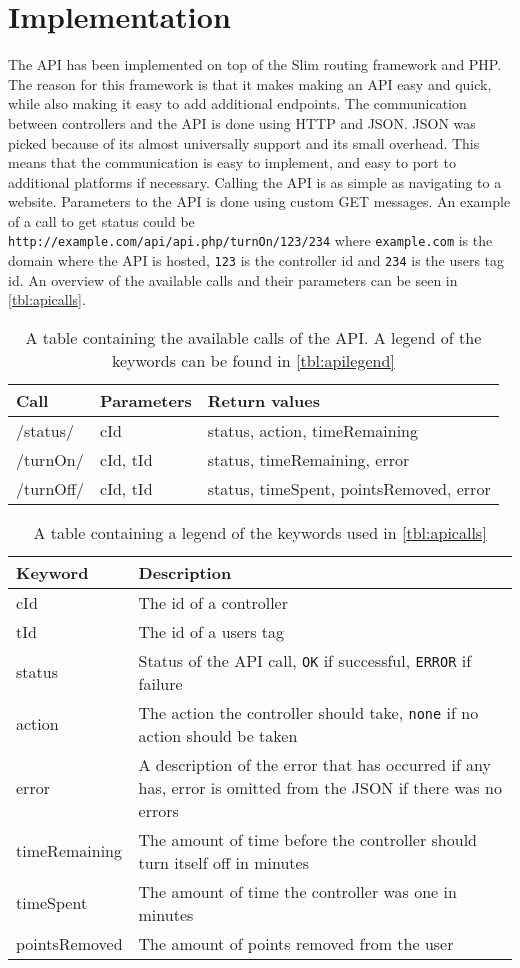 \section{Implementation}
The API has been implemented on top of the Slim routing framework and PHP. The reason for this framework is that it makes making an API easy and quick, while also making it easy to add additional endpoints. The communication between controllers and the API is done using HTTP and JSON. JSON was picked because of its almost universally support and its small overhead. This means that the communication is easy to implement, and easy to port to additional platforms if necessary. Calling the API is as simple as navigating to a website. Parameters to the API is done using custom GET messages. An example of a call to get status could be \texttt{http://example.com/api/api.php/turnOn/123/234} where \texttt{example.com} is the domain where the API is hosted, \texttt{123} is the controller id and \texttt{234} is the users tag id. An overview of the available calls and their parameters can be seen in \autoref{tbl:apicalls}.

\begin{table}[!h]
\begin{tabular}{| l | l | l |}
\hline
Call & Parameters & Return values \\
\hline
/status/ & cId & status, action, timeRemaining \\
\hline
/turnOn/ & cId, tId & status, timeRemaining, error \\
\hline
/turnOff/ & cId, tId & status, timeSpent, pointsRemoved, error \\
\hline
\end{tabular}
\caption{A table containing the available calls of the API. A legend of the keywords can be found in \autoref{tbl:apilegend}}
\label{tbl:apicalls}
\end{table}

\begin{table}[!h]
\begin{tabular}{| l | p{9cm} |}
\hline
Keyword & Description \\
\hline
cId & The id of a controller \\
\hline
tId & The id of a users tag \\
\hline
status & Status of the API call, \texttt{OK} if successful, \texttt{ERROR} if failure \\
\hline
action & The action the controller should take, \texttt{none} if no action should be taken \\
\hline
error & A description of the error that has occurred if any has, error is omitted from the JSON if there was no errors \\
\hline
timeRemaining & The amount of time before the controller should turn itself off in minutes \\
\hline
timeSpent & The amount of time the controller was one in minutes \\
\hline
pointsRemoved & The amount of points removed from the user \\
\hline
\end{tabular}
\caption{A table containing a legend of the keywords used in \autoref{tbl:apicalls}}
\label{tbl:apilegend}
\end{table}